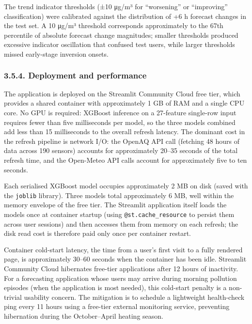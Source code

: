 The trend indicator thresholds (±10 μg/m³ for ``worsening'' or ``improving'' classification) were calibrated against the distribution of +6 h forecast changes in the test set. A 10 μg/m³ threshold corresponds approximately to the 67th percentile of absolute forecast change magnitudes; smaller thresholds produced excessive indicator oscillation that confused test users, while larger thresholds missed early-stage inversion onsets.

\subsubsection{3.5.4. Deployment and performance}\label{deployment-and-performance}

The application is deployed on the Streamlit Community Cloud free tier, which provides a shared container with approximately 1 GB of RAM and a single CPU core. No GPU is required: XGBoost inference on a 27-feature single-row input requires fewer than five milliseconds per model, so the three models combined add less than 15 milliseconds to the overall refresh latency. The dominant cost in the refresh pipeline is network I/O: the OpenAQ API call (fetching 48 hours of data across 190 sensors) accounts for approximately 20--35 seconds of the total refresh time, and the Open-Meteo API calls account for approximately five to ten seconds.

Each serialised XGBoost model occupies approximately 2 MB on disk (saved with the \texttt{joblib} library). Three models total approximately 6 MB, well within the memory envelope of the free tier. The Streamlit application itself loads the models once at container startup (using \texttt{@st.cache\_resource} to persist them across user sessions) and then accesses them from memory on each refresh; the disk read cost is therefore paid only once per container restart.

Container cold-start latency, the time from a user's first visit to a fully rendered page, is approximately 30--60 seconds when the container has been idle. Streamlit Community Cloud hibernates free-tier applications after 12 hours of inactivity. For a forecasting application whose users may arrive during morning pollution episodes (when the application is most needed), this cold-start penalty is a non-trivial usability concern. The mitigation is to schedule a lightweight health-check ping every 11 hours using a free-tier external monitoring service, preventing hibernation during the October--April heating season.

